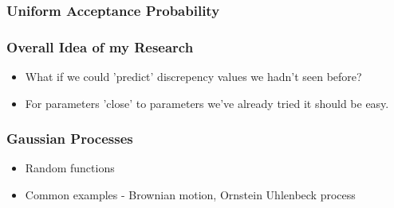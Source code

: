\documentclass{beamer}
\begin{document}
\begin{frame}
    \frametitle{Uniform Acceptance Probability}
    \begin{figure}
        \centering
    \end{figure}


\end{frame}

\begin{frame}
    \frametitle{Overall Idea of my Research}
    \begin{itemize}
        \item What if we could 'predict' discrepency values we hadn't seen before?
        \item <2-> For parameters 'close' to parameters we've already tried it should be easy.
    \end{itemize}
\end{frame}

\begin{frame}
    \frametitle{Gaussian Processes}
    \begin{itemize}
        \item Random functions
        \item Common examples - Brownian motion, Ornstein Uhlenbeck process
    \end{itemize}
\end{frame}
\end{document}
